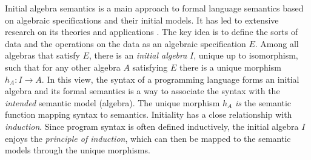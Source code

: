 \documentclass[11pt]{article}
\begin{document}
Initial algebra semantics \cite{GTWW77} is a main approach to formal 
language semantics based on algebraic specifications and their 
initial models.
It has led to extensive research on its theories and applications
\cite{GWM+00,CDE+20,DF98,agda-ias,ASF+SDF,CASL}.
The key idea is to define the sorts of data and the operations on the data
as an algebraic specification $E$.
Among all algebras that satisfy $E$, 
there is an \emph{initial algebra} $I$, unique up to isomorphism,
such that for any other algebra $A$ satisfying $E$
there is a unique morphism $h_A \colon I \to A$. 
In this view, the syntax of a programming language {forms} 
an initial algebra and its formal semantics is a way to associate the syntax 
with the 
\emph{intended} semantic model (algebra).
The unique morphism $h_A$ \emph{is} the semantic function mapping syntax to 
semantics. 
Initiality has a close relationship with \emph{induction}.
Since program syntax is often defined inductively, the initial algebra $I$
enjoys the \emph{principle of induction}, which can then be mapped to the 
semantic models through the unique morphisms. 
\end{document}
